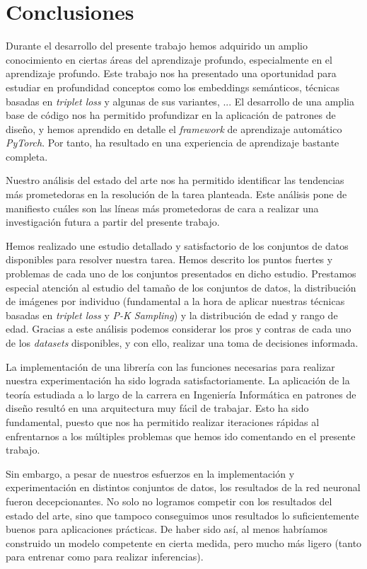 \chapter{Conclusiones} \label{ich:conclusiones}



Durante el desarrollo del presente trabajo hemos adquirido un amplio conocimiento en ciertas áreas del aprendizaje profundo, especialmente en el aprendizaje profundo. Este trabajo nos ha presentado una oportunidad para estudiar en profundidad conceptos como los embeddings semánticos, técnicas basadas en \textit{triplet loss} y algunas de sus variantes, ... El desarrollo de una amplia base de código nos ha permitido profundizar en la aplicación de patrones de diseño, y hemos aprendido en detalle el \textit{framework} de aprendizaje automático \textit{PyTorch}. Por tanto, ha resultado en una experiencia de aprendizaje bastante completa.

Nuestro análisis del estado del arte nos ha permitido identificar las tendencias más prometedoras en la resolución de la tarea planteada. Este análisis pone de manifiesto cuáles son las líneas más prometedoras de cara a realizar una investigación futura a partir del presente trabajo.

Hemos realizado une estudio detallado y satisfactorio  de los conjuntos de datos disponibles para resolver nuestra tarea. Hemos descrito los puntos fuertes y problemas de cada uno de los conjuntos presentados en dicho estudio. Prestamos especial atención al estudio del tamaño de los conjuntos de datos, la distribución de imágenes por individuo (fundamental a la hora de aplicar nuestras técnicas basadas en \textit{triplet loss} y \textit{P-K Sampling}) y la distribución de edad y rango de edad. Gracias a este análisis podemos considerar los pros y contras de cada uno de los \textit{datasets} disponibles, y con ello, realizar una toma de decisiones informada.

La implementación de una librería con las funciones necesarias para realizar nuestra experimentación ha sido lograda satisfactoriamente. La aplicación de la teoría estudiada a lo largo de la carrera en Ingeniería Informática en patrones de diseño resultó en una arquitectura muy fácil de trabajar. Esto ha sido fundamental, puesto que nos ha permitido realizar iteraciones rápidas al enfrentarnos a los múltiples problemas que hemos ido comentando en el presente trabajo.

Sin embargo, a pesar de nuestros esfuerzos en la implementación y experimentación en distintos conjuntos de datos, los resultados de la red neuronal fueron decepcionantes. No solo no logramos competir con los resultados del estado del arte, sino que tampoco conseguimos unos resultados lo suficientemente buenos para aplicaciones prácticas. De haber sido así, al menos habríamos construido un modelo competente en cierta medida, pero mucho más ligero (tanto para entrenar como para realizar inferencias).


